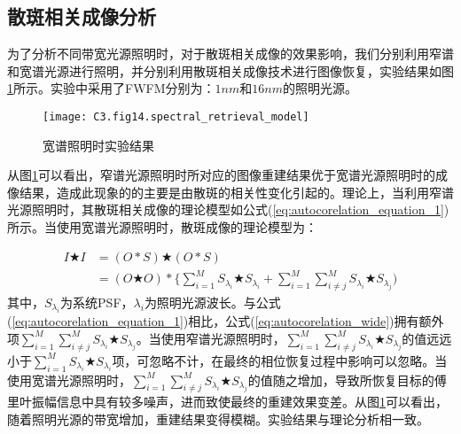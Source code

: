 \subsection{散斑相关成像分析}
为了分析不同带宽光源照明时，对于散斑相关成像的效果影响，我们分别利用窄谱和宽谱光源进行照明，并分别利用散斑相关成像技术进行图像恢复，实验结果如图\ref{fig:3.13}所示。实验中采用了FWFM分别为：$1nm$和$16nm$的照明光源。
\begin{figure}[htp]
	\centering
	\texttt{[image: C3.fig14.spectral\_retrieval\_model]}
	\caption{宽谱照明时实验结果}
	\label{fig:3.13}
\end{figure}
从图\ref{fig:3.13}可以看出，窄谱光源照明时所对应的图像重建结果优于宽谱光源照明时的成像结果，造成此现象的的主要是由散斑的相关性变化引起的。理论上，当利用窄谱光源照明时，其散斑相关成像的理论模型如公式(\ref{eq:autocorelation_equation_1})所示。当使用宽谱光源照明时，散斑成像的理论模型为：

\begin{equation}
\begin{aligned}
    I \bigstar I  &= (O*S) \bigstar (O*S) \\
		              &=  (O \bigstar O)*\{\sum_{i=1}^{M} S_{\lambda_i} \bigstar S_{\lambda_i}+ \sum_{i=1}^{M}\sum_{i \ne j}^{M} S_{\lambda_i} \bigstar S_{\lambda_j})
\end{aligned}
\label{eq:autocorelation_wide}
\end{equation}
其中，$S_{\lambda_i}$为系统PSF，$\lambda_i$为照明光源波长。与公式(\ref{eq:autocorelation_equation_1})相比，公式(\ref{eq:autocorelation_wide})拥有额外项$\sum_{i=1}^{M}\sum_{i \ne j}^{M} S_{\lambda_i} \bigstar S_{\lambda_j}$。当使用窄谱光源照明时，$\sum_{i=1}^{M}\sum_{i \ne j}^{M} S_{\lambda_i} \bigstar S_{\lambda_j}$的值远远小于$\sum_{i=1}^{M} S_{\lambda_i} \bigstar S_{\lambda_i}$项，可忽略不计，在最终的相位恢复过程中影响可以忽略。当使用宽谱光源照明时，$\sum_{i=1}^{M}\sum_{i \ne j}^{M} S_{\lambda_i} \bigstar S_{\lambda_j}$的值随之增加，导致所恢复目标的傅里叶振幅信息中具有较多噪声，进而致使最终的重建效果变差。从图\ref{fig:3.13}可以看出，随着照明光源的带宽增加，重建结果变得模糊。实验结果与理论分析相一致。
